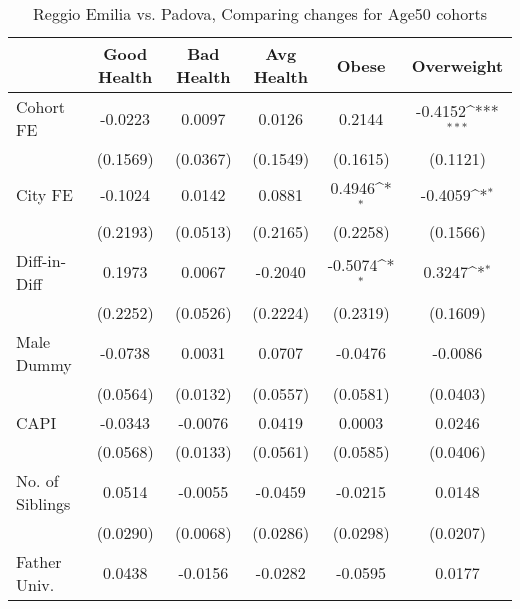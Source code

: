 \begin{table}[htbp]\centering
\def\sym#1{\ifmmode^{#1}\else\(^{#1}\)\fi}
\caption{Reggio Emilia vs. Padova, Comparing changes for Age50 cohorts}
\begin{tabular}{l*{5}{c}}
\toprule
            &\multicolumn{1}{c}{Good Health}&\multicolumn{1}{c}{Bad Health}&\multicolumn{1}{c}{Avg Health}&\multicolumn{1}{c}{Obese}&\multicolumn{1}{c}{Overweight}\\
\midrule
Cohort FE   &     -0.0223         &      0.0097         &      0.0126         &      0.2144         &     -0.4152\sym{***}\\
            &    (0.1569)         &    (0.0367)         &    (0.1549)         &    (0.1615)         &    (0.1121)         \\
\addlinespace
City FE     &     -0.1024         &      0.0142         &      0.0881         &      0.4946\sym{*}  &     -0.4059\sym{*}  \\
            &    (0.2193)         &    (0.0513)         &    (0.2165)         &    (0.2258)         &    (0.1566)         \\
\addlinespace
Diff-in-Diff&      0.1973         &      0.0067         &     -0.2040         &     -0.5074\sym{*}  &      0.3247\sym{*}  \\
            &    (0.2252)         &    (0.0526)         &    (0.2224)         &    (0.2319)         &    (0.1609)         \\
\addlinespace
Male Dummy  &     -0.0738         &      0.0031         &      0.0707         &     -0.0476         &     -0.0086         \\
            &    (0.0564)         &    (0.0132)         &    (0.0557)         &    (0.0581)         &    (0.0403)         \\
\addlinespace
CAPI        &     -0.0343         &     -0.0076         &      0.0419         &      0.0003         &      0.0246         \\
            &    (0.0568)         &    (0.0133)         &    (0.0561)         &    (0.0585)         &    (0.0406)         \\
\addlinespace
No. of Siblings&      0.0514         &     -0.0055         &     -0.0459         &     -0.0215         &      0.0148         \\
            &    (0.0290)         &    (0.0068)         &    (0.0286)         &    (0.0298)         &    (0.0207)         \\
\addlinespace
Father Univ.&      0.0438         &     -0.0156         &     -0.0282         &     -0.0595         &      0.0177         \\

\end{tabular}
\end{table}
